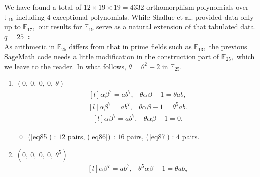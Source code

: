 \documentclass[12pt,a4wide, reqno]{amsart}
\theoremstyle{definition}
\theoremstyle{remark}
\numberwithin{equation}{section}
\begin{document}
We have found a total of $12\times 19\times 19=4332$ orthomorphism polynomials over $\mathbb{F}_{19}$ including $4$ exceptional polynomials. While Shallue et al. \cite{shallue} provided data only up to $\mathbb{F}_{17},$ our results for $\mathbb{F}_{19}$ serve as a natural extension of that tabulated data.
\vspace{0.5 cm}
\\
\underline{\Large \textbf{$q=25$~:}}
\vspace{0.2cm}\\
As arithmetic in $\mathbb{F}_{25}$ differs from that in prime fields such as $\mathbb{F}_{13},$ the previous SageMath code needs a little modification in the construction part of $\mathbb{F}_{25},$ which we leave to the reader. In what follows, $\theta=\theta^2+2$ in $\mathbb{F}_{25}$. 
 \begin{enumerate}[label=\textbf{(\arabic*)}]
     \item 
     $(0,~0,~0,~0,~\theta)$ 
\begin{equation}\label{eq85}
    \begin{matrix*}[l]
         \alpha \beta ^7=ab^7, & \theta\alpha\beta-1=\theta ab,
    \end{matrix*}
\end{equation}
\begin{equation}\label{eq86}
    \begin{matrix*}[l]
         \alpha \beta ^7=ab^7, & \theta\alpha\beta-1=\theta^5ab.
    \end{matrix*}
\end{equation}
\begin{equation}\label{eq87}
    \begin{matrix*}[l]
         \alpha \beta ^7=ab^7, & \theta\alpha\beta-1=0.
    \end{matrix*}
\end{equation}
\begin{itemize}
    \item 
    (\ref{eq85}) : $12$ pairs, (\ref{eq86}) : $16$ pairs, (\ref{eq87}) : $4$ pairs.
    \end{itemize}
 \item 
 $(0,~0,~0,~0,~\theta^5)$ 
\begin{equation}\label{eq88}
    \begin{matrix*}[l]
         \alpha \beta ^7=ab^7, & \theta^5\alpha\beta-1=\theta ab,
    \end{matrix*}
\end{equation}
\begin{equation}\label{eq89}

\end{equation}
\end{enumerate}
\end{document}
